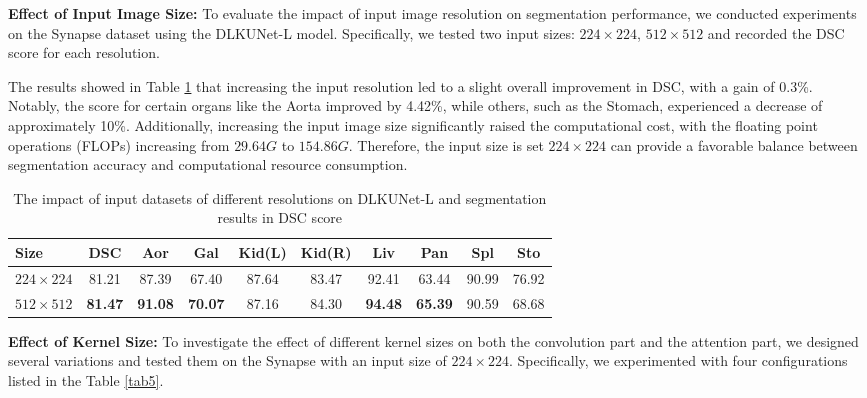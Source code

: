 \documentclass[sn-mathphys-num]{sn-jnl}
\theoremstyle{thmstyleone}%
\theoremstyle{thmstyletwo}%
\theoremstyle{thmstylethree}%
\begin{document}
\textbf{Effect of Input Image Size:}
To evaluate the impact of input image resolution on segmentation performance, we conducted experiments on the Synapse dataset using the DLKUNet-L model.
Specifically, we tested two input sizes: \(224\times 224\), \(512\times 512\) and recorded the DSC score for each resolution.

The results showed in Table \ref{tab4} that increasing the input resolution led to a slight overall improvement in DSC, with a gain of 0.3\%.
Notably, the score for certain organs like the Aorta improved by 4.42\%, while others, such as the Stomach, experienced a decrease of approximately 10\%.
Additionally, increasing the input image size significantly raised the computational cost, with the floating point operations (FLOPs) increasing from \(29.64G\) to \(154.86G\).
Therefore, the input size is set \(224\times 224\) can provide a favorable balance between segmentation accuracy and computational resource consumption.

\begin{table}[h]
    \centering
    \caption{The impact of input datasets of different resolutions on DLKUNet-L and segmentation results in DSC score}
    \label{tab4}
    \begin{tabular*}{\textwidth}{@{\extracolsep{\fill}}lccccccccc}
        \toprule
        \textbf{Size} & \textbf{DSC} & \textbf{Aor} & \textbf{Gal} & \textbf{Kid(L)} & \textbf{Kid(R)} & \textbf{Liv} & \textbf{Pan} & \textbf{Spl} & \textbf{Sto} \\
        \midrule
        \(224\times 224\) & 81.21 & 87.39 & 67.40 & 87.64 & 83.47 & 92.41 & 63.44 & 90.99 & 76.92 \\
        \(512\times 512\) & \textbf{81.47} & \textbf{91.08} & \textbf{70.07} & 87.16 & 84.30 & \textbf{94.48} & \textbf{65.39} & 90.59 & 68.68 \\
        \bottomrule
    \end{tabular*}
\end{table}

\textbf{Effect of Kernel Size:}
To investigate the effect of different kernel sizes on both the convolution part and the attention part, we designed several variations and tested them on the Synapse with an input size of \(224\times 224\).
Specifically, we experimented with four configurations listed in the Table \ref{tab5}.
\end{document}
